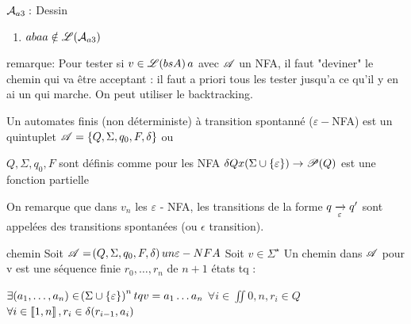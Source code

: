     \begin{example}{}{}
        $\mathcal{A}_{a3} :$
        Dessin %
        \begin{enumerate}
            \item 
            
            
            \itt $abaa \notin \mathscr{L}(\mathcal{A}_{a3})$
        \end{enumerate}
    \end{example}
    
    
    remarque: Pour tester si $v\in \mathscr{L}\!\left(bsA\right) a$ avec $\mathscr{A}$ un NFA, il faut "deviner" le chemin qui va être acceptant : il faut a priori tous les tester jusqu'a ce qu'il y en ai un qui marche. On peut utiliser le backtracking.
    
    \begin{definition}{}{}
        Un automates finis (non déterministe) 
        à transition spontanné ($\varepsilon -$NFA) %
        est un quintuplet $\mathscr{A} = \left\{Q, \Sigma, q_0, F, \delta\right\}$ ou 
        
        \begin{enumerate}
            \itt $Q, \Sigma, q_0, F$ sont définis comme pour les NFA
            \itt $\delta Q x \!\left(\Sigma \cup \left\{\varepsilon\right\}\right) \to \mathscr{P} \!\left(Q\right)$ est une fonction partielle
        \end{enumerate}
        
    \end{definition}
    
    On remarque que dans $v_n$ les $\varepsilon$ - NFA,  les transitions de la forme $q \lima{\epsilon} q'$ sont appelées des transitions spontanées (ou $\epsilon$ transition).
    
    
    \begin{definition}{chemin}{}
        Soit $\mathscr{A} = \!\left(Q, \Sigma, q_0, F, \delta\right) un \varepsilon-NFA$ Soit $v \in \Sigma^\star$ Un chemin dans $\mathscr{A}$ pour v est une séquence finie $r_0, \dots , r_n$ de $n+1$ états tq :
        
        \begin{enumerate}
            \itt $\exists (a_1, \dots, a_n) \in \!\left(\Sigma \cup \left\{\varepsilon\right\}\right)^n tq v = a_1 \dots a_n$
            \itt $\forall i \in \iint{0, n}, r_i \in Q$
            \itt $\forall i \in \left\llbracket1, n\right\rrbracket, r_i \in \delta \!\left(r_{i-1}, a_i\right)$
        \end{enumerate}
            
    \end{definition}
    
